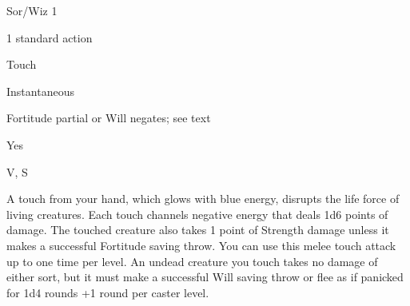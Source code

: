 
\begin{description*}
\item[Level:] Sor/Wiz 1
\item[Casting Time:] 1 standard action
\item[Range:] Touch
\item[Duration:] Instantaneous
\item[Saving Throw:] Fortitude partial or Will negates; see text
\item[Spell Resistance:] Yes
\item[Components:] V, S
\end{description*}

A touch from your hand, which glows with blue energy, disrupts the life force of
living creatures. Each touch channels negative energy that deals 1d6 points of
damage. The touched creature also takes 1 point of Strength damage unless it makes
a successful Fortitude saving throw. You can use this melee touch attack up to
one time per level.
An undead creature you touch takes no damage of either sort, but it must make a
successful Will saving throw or flee as if panicked for 1d4 rounds +1 round per
caster level.
